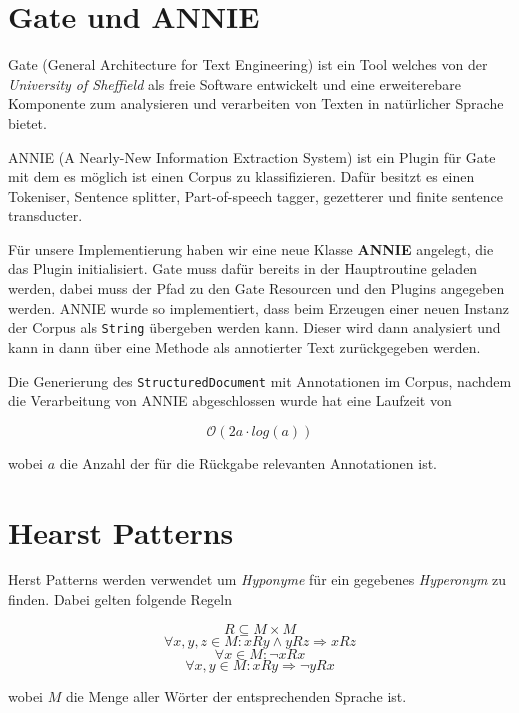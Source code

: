 \section{Gate und ANNIE}

Gate (General Architecture for Text Engineering) ist ein Tool welches
von der \textit{University of Sheffield} als freie Software entwickelt
und eine erweiterebare Komponente zum analysieren und verarbeiten von
Texten in natürlicher Sprache bietet.
\cite{Cunningham:2000}

ANNIE (A Nearly-New Information Extraction System) ist ein Plugin für
Gate mit dem es möglich ist einen Corpus zu klassifizieren. Dafür
besitzt es einen Tokeniser, Sentence splitter, Part-of-speech tagger,
gezetterer und finite sentence transducter.
\cite{Cunningham:2002}

Für unsere Implementierung haben wir eine neue Klasse \textbf{ANNIE}
angelegt, die das Plugin initialisiert. Gate muss dafür bereits in der
Hauptroutine geladen werden, dabei muss der Pfad zu den Gate Resourcen
und den Plugins angegeben werden. ANNIE wurde so implementiert, dass
beim Erzeugen einer neuen Instanz der Corpus als \lstinline{String}
übergeben werden kann. Dieser wird dann analysiert und kann in dann
über eine Methode als annotierter Text zurückgegeben werden. 

Die Generierung des \lstinline{StructuredDocument} mit Annotationen im
Corpus, nachdem die Verarbeitung von ANNIE abgeschlossen wurde hat
eine Laufzeit von

$$\mathcal{O}(2a \cdot log(a))$$ %

wobei $a$ die Anzahl der für die Rückgabe relevanten Annotationen ist.


\section{Hearst Patterns}

Herst Patterns werden verwendet um \textit{Hyponyme} für ein gegebenes
\textit{Hyperonym} zu finden. Dabei gelten folgende Regeln

$$R \subseteq M \times M$$
$$\forall x, y, z \in M : xRy \land yRz \Rightarrow xRz$$
$$\forall x \in M : \neg xRx$$
$$\forall x, y \in M : xRy \Rightarrow \neg yRx$$

wobei $M$ die Menge aller Wörter der entsprechenden Sprache ist.

